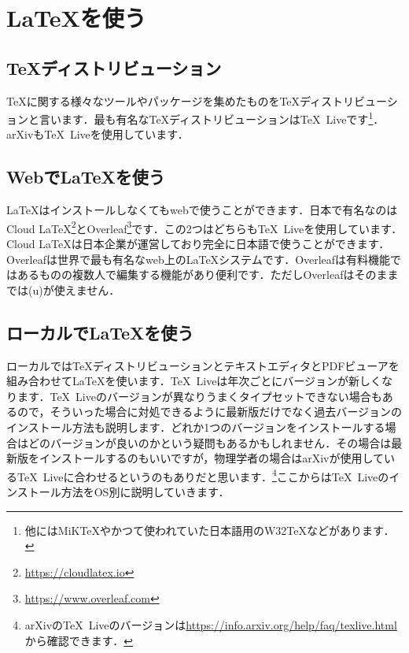 \section{\LaTeX を使う}
\subsection{\TeX ディストリビューション}
\TeX に関する様々なツールやパッケージを集めたものを\TeX ディストリビューションと言います．最も有名な\TeX ディストリビューションは\TeX\ Liveです\footnote{他にはMiK\TeX やかつて使われていた日本語用のW32\TeX などがあります．}．arXivも\TeX\ Liveを使用しています．

\subsection{Webで\LaTeX を使う}
\LaTeX はインストールしなくてもwebで使うことができます．日本で有名なのはCloud LaTeX\footnote{\url{https://cloudlatex.io}}とOverleaf\footnote{\url{https://www.overleaf.com}}です．この2つはどちらも\TeX\ Liveを使用しています．Cloud LaTeXは日本企業が運営しており完全に日本語で使うことができます．Overleafは世界で最も有名なweb上の\LaTeX システムです．Overleafは有料機能ではあるものの複数人で編集する機能があり便利です．ただしOverleafはそのままでは(u)\pLaTeX が使えません．

\subsection{ローカルで\LaTeX を使う}
ローカルでは\TeX ディストリビューションとテキストエディタとPDFビューアを組み合わせて\LaTeX を使います．\TeX\ Liveは年次ごとにバージョンが新しくなります．\TeX\ Liveのバージョンが異なりうまくタイプセットできない場合もあるので，そういった場合に対処できるように最新版だけでなく過去バージョンのインストール方法も説明します．どれか1つのバージョンをインストールする場合はどのバージョンが良いのかという疑問もあるかもしれません．その場合は最新版をインストールするのもいいですが，物理学者の場合はarXivが使用している\TeX\ Liveに合わせるというのもありだと思います．\footnote{arXivの\TeX\ Liveのバージョンは\url{https://info.arxiv.org/help/faq/texlive.html}から確認できます．}ここからは\TeX\ Liveのインストール方法をOS別に説明していきます．

